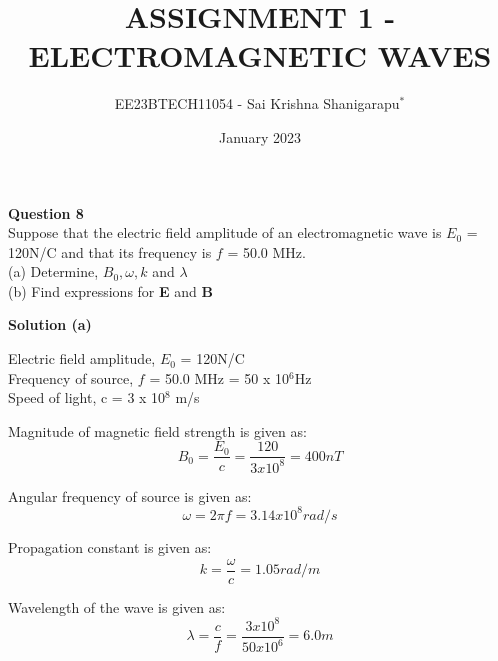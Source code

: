 \documentclass[journal,12pt,twocolumn]{IEEEtran}
\theoremstyle{remark}
\begin{document}

\vspace{3cm}

\title{ASSIGNMENT 1 - ELECTROMAGNETIC WAVES}
\author{EE23BTECH11054 - Sai Krishna Shanigarapu$^{*}$%
}
\date{January 2023}
\maketitle
\newpage
\bigskip

\begin{flushleft}
\textbf{Question 8}\\
Suppose that the electric field amplitude of an electromagnetic wave is $E_0$ = 120N/C and that its frequency is $f$ = 50.0 MHz.\\
(a) Determine, $B_0, \omega, k$ and $\lambda$\\
(b) Find expressions for \textbf{E} and \textbf{B}\\
\end{flushleft}

\bigskip

\begin{flushleft}
\textbf{Solution (a)}\\
\begin{flushleft}
    Electric field amplitude, $E_0$ = 120N/C\\
    Frequency of source, $f$ = 50.0 MHz = 50 x 10$^6$Hz\\
    Speed of light, c = 3 x 10$^8$ m/s\\
\end{flushleft}
Magnitude of magnetic field strength is given as: \\
\begin{equation}
    B_0 = \frac{E_0}{c} = \frac{120}{3 x 10^8} = 400nT
\end{equation}

Angular frequency of source is given as:
\begin{equation}
    \omega = 2\pi f = 3.14 x 10^8 rad/s
\end{equation}

Propagation constant is given as:
\begin{equation}
     k = \frac{\omega}{c} = 1.05 rad/m
\end{equation}

Wavelength of the wave is given as:
\begin{equation}
    \lambda = \frac{c}{f} = \frac{3 x 10^8}{50 x 10^6} = 6.0m    
\end{equation}

\end{flushleft}
\end{document}
